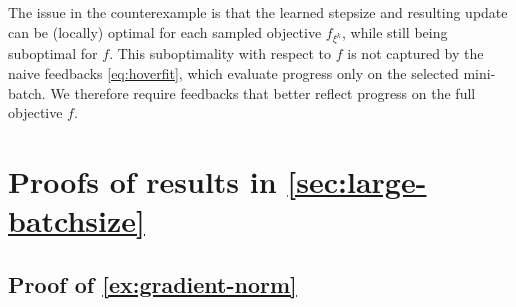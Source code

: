 \documentclass{article}
\theoremstyle{definition}
\begin{document}
The issue in the counterexample is that the learned stepsize and resulting update can be (locally) optimal for each sampled objective $f_{\xi^k}$, while still being suboptimal for $f$. 
This suboptimality with respect to $f$ is not captured by the naive feedbacks \eqref{eq:hoverfit}, which evaluate progress only on the selected mini-batch.
We therefore require feedbacks that better reflect progress on the full objective $f$.

\section{Proofs of results in \cref{sec:large-batchsize}}

\subsection{Proof of \cref{ex:gradient-norm}} \label{app:gradient-norm-ex}
\end{document}
